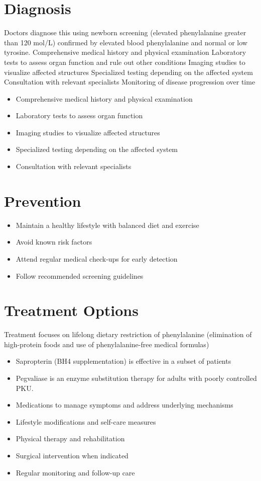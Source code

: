 \section{Diagnosis}
Doctors diagnose this using newborn screening (elevated phenylalanine greater than 120 \textmu mol/L) confirmed by elevated blood phenylalanine and normal or low tyrosine. Comprehensive medical history and physical examination Laboratory tests to assess organ function and rule out other conditions Imaging studies to visualize affected structures Specialized testing depending on the affected system Consultation with relevant specialists Monitoring of disease progression over time

\begin{itemize}[noitemsep]
  \item Comprehensive medical history and physical examination
  \item Laboratory tests to assess organ function
  \item Imaging studies to visualize affected structures
  \item Specialized testing depending on the affected system
  \item Consultation with relevant specialists
\end{itemize}
\section{Prevention}
\begin{itemize}[noitemsep]
  \item Maintain a healthy lifestyle with balanced diet and exercise
  \item Avoid known risk factors
  \item Attend regular medical check-ups for early detection
  \item Follow recommended screening guidelines
\end{itemize}
\section{Treatment Options}
Treatment focuses on lifelong dietary restriction of phenylalanine (elimination of high-protein foods and use of phenylalanine-free medical formulas)

\begin{itemize}[noitemsep]
  \item Sapropterin (BH4 supplementation) is effective in a subset of patients
  \item Pegvaliase is an enzyme substitution therapy for adults with poorly controlled PKU.
  \item Medications to manage symptoms and address underlying mechanisms
  \item Lifestyle modifications and self-care measures
  \item Physical therapy and rehabilitation
  \item Surgical intervention when indicated
  \item Regular monitoring and follow-up care
\end{itemize}
